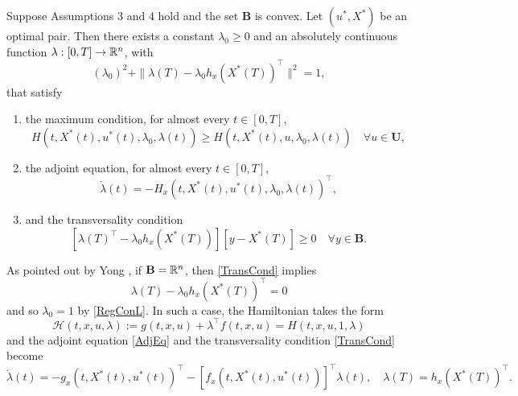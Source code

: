 \begin{theorem} Suppose Assumptions 3 and 4 hold and the set $\mathbf{B}$ is convex. Let $(u^\ast,X^\ast)$ be an optimal pair. Then there exists a constant $\lambda_0\geq 0$ and an absolutely continuous function $\lambda:[0,T]\to\mathbb{R}^n$, with
    \begin{equation}\label{RegConL}
        (\lambda_0)^2 + \|\lambda(T)-\lambda_0h_x(X^\ast(T))^\top\|^2 = 1,
    \end{equation}
that satisfy
\begin{enumerate}[\rm (a)]
    \item the maximum condition, for almost every $t\in[0,T]$, 
        \begin{equation}\label{MaxCond}
             H(t,X^\ast(t),u^\ast(t),\lambda_0,\lambda(t)) \geq  H(t,X^\ast(t),u,\lambda_0,\lambda(t)) \quad \forall u\in \mathbf{U},
        \end{equation}
\item the adjoint equation, for almost every $t\in[0,T]$, 
      \begin{equation}\label{AdjEq}
          \dot{\lambda}(t) = -H_x(t,X^\ast(t),u^\ast(t),\lambda_0,\lambda(t))^\top,  
      \end{equation}
\item and the transversality condition
   \begin{equation}\label{TransCond}
    [\lambda(T)^\top-\lambda_0h_x(X^\ast(T))] [y-X^\ast(T)]\geq 0 \quad \forall y\in \mathbf{B}.
   \end{equation}
\end{enumerate}
\end{theorem}


\begin{remark}\label{RemNoCons}\rm
As pointed out by Yong \cite[p. 43]{Yong2015}, if $\mathbf{B}=\mathbb{R}^n$, then \eqref{TransCond} implies 
  \[\lambda(T)-\lambda_0h_x(X^\ast(T))^\top=0\]
  and so $\lambda_0=1$ by \eqref{RegConL}. In such a case, the Hamiltonian takes the form  
      \[\mathcal{H}(t,x,u,\lambda):= g(t,x,u) + \lambda^\top f(t,x,u) = H(t,x,u,1,\lambda)  \]  
    and the adjoint equation \eqref{AdjEq} and the transversality condition \eqref{TransCond} become 
    \[    \dot{\lambda}(t) = -g_x(t,X^\ast(t),u^\ast(t))^\top -  [f_x(t,X^\ast(t),u^\ast(t))]^\top \lambda(t), \quad \lambda(T)=h_x(X^\ast(T))^\top.
  \]
  \end{remark}
 


